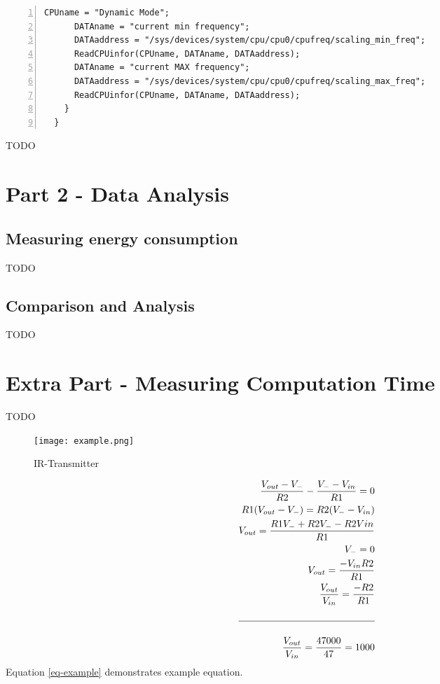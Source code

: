 \documentclass{article} %
\begin{document}
\begin{lstlisting}[float=*,caption={Dynamic Frequency Scaling Mode Mixed},label={lst:DFS_mixed},numbers=left]
      CPUname = "Dynamic Mode";
      DATAname = "current min frequency";
      DATAaddress = "/sys/devices/system/cpu/cpu0/cpufreq/scaling_min_freq";
      ReadCPUinfor(CPUname, DATAname, DATAaddress);
      DATAname = "current MAX frequency";
      DATAaddress = "/sys/devices/system/cpu/cpu0/cpufreq/scaling_max_freq";
      ReadCPUinfor(CPUname, DATAname, DATAaddress);
    }
  }
\end{lstlisting}
TODO

\section{Part 2 - Data Analysis}
\subsection{Measuring energy consumption}
TODO

\subsection{Comparison and Analysis}
TODO

\section{Extra Part - Measuring Computation Time}
TODO

\begin{figure}[!hbt]
\begin{center}
\texttt{[image: example.png]}
\end{center}
\caption{IR-Transmitter}
\label{FIG-TRANSMITTER}
\end{figure}

\begin{equation}
\begin{split}
\frac{V_{out}-V_-}{R2}-\frac{V_--V_{in}}{R1}=0 \\
R1(V_{out}-V_-)=R2(V_--V_{in}) \\
V_{out}=\frac{R1V_-+R2V_--R2V{in}}{R1} \\
V_-=0 \\
V_{out}=\frac{-V_{in}R2}{R1} \\
\frac{V_{out}}{V_{in}}=\frac{-R2}{R1} \\ \\
\hline \\
\frac{V_{out}}{V_{in}}=\frac{47000}{47}=1000 \\
\end{split}
\label{eq-example}
\end{equation}
Equation \ref{eq-example} demonstrates example equation.


\end{document}

